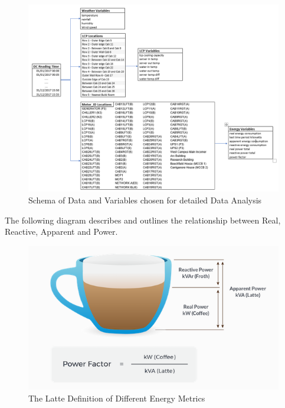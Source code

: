 \documentclass[12pt]{scrartcl}
\begin{document}
\begin{figure}[h]
  \caption{Schema of Data and Variables chosen for detailed Data Analysis}
  \label{fig:finalvariables}
  \centering
    \includegraphics[scale=0.40]{finalvariables}
\end{figure} 

The following diagram describes and outlines the relationship between \gls{Real}, \gls{Reactive}, \gls{Apparent} and \gls{Power}. 

\begin{figure}[h]
  \caption{The Latte Definition of Different Energy Metrics}
  \label{fig:coffeeenergyanaliogy}
  \centering
    \includegraphics[scale=0.50]{power_explanation}
\end{figure} 
\end{document}
